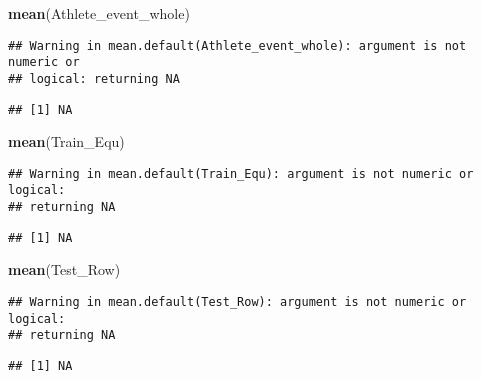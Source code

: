 \documentclass[]{article}
\newenvironment{Shaded}{\begin{snugshade}}{\end{snugshade}}
\newcommand{\KeywordTok}[1]{\textcolor[rgb]{0.13,0.29,0.53}{\textbf{#1}}}
\newcommand{\OperatorTok}[1]{\textcolor[rgb]{0.81,0.36,0.00}{\textbf{#1}}}
\newcommand{\NormalTok}[1]{#1}
\begin{document}
\begin{Shaded}
\begin{Highlighting}[]
\KeywordTok{mean}\NormalTok{(Athlete_event_whole)}
\end{Highlighting}
\end{Shaded}

\begin{verbatim}
## Warning in mean.default(Athlete_event_whole): argument is not numeric or
## logical: returning NA
\end{verbatim}

\begin{verbatim}
## [1] NA
\end{verbatim}

\begin{Shaded}
\begin{Highlighting}[]
\KeywordTok{mean}\NormalTok{(Train_Equ)}
\end{Highlighting}
\end{Shaded}

\begin{verbatim}
## Warning in mean.default(Train_Equ): argument is not numeric or logical:
## returning NA
\end{verbatim}

\begin{verbatim}
## [1] NA
\end{verbatim}

\begin{Shaded}
\begin{Highlighting}[]
\KeywordTok{mean}\NormalTok{(Test_Row)}
\end{Highlighting}
\end{Shaded}

\begin{verbatim}
## Warning in mean.default(Test_Row): argument is not numeric or logical:
## returning NA
\end{verbatim}

\begin{verbatim}
## [1] NA
\end{verbatim}

\begin{Shaded}
\end{Shaded}
\end{document}

